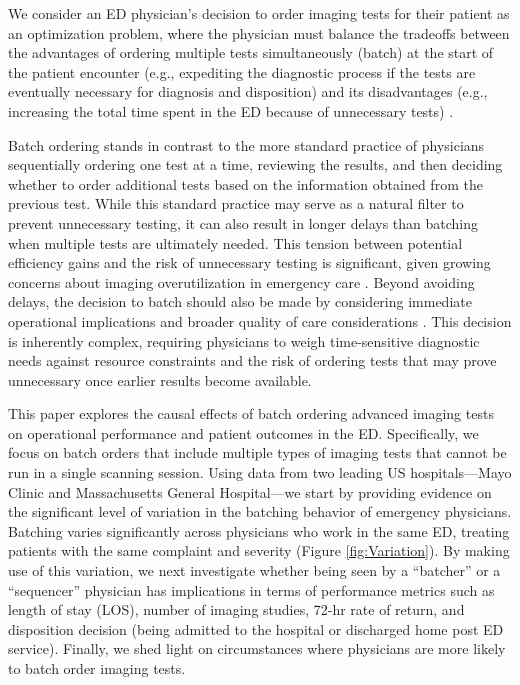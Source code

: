 \documentclass[,,nonblindrev]{informs}
\begin{document}
We consider an ED physician's decision to order imaging tests for their
patient as an optimization problem, where the physician must balance the
tradeoffs between the advantages of ordering multiple tests
simultaneously (batch) at the start of the patient encounter (e.g.,
expediting the diagnostic process if the tests are eventually necessary
for diagnosis and disposition) and its disadvantages (e.g., increasing
the total time spent in the ED because of unnecessary tests)
\citep[\citet{Perotte2018}, \citet{Lyu2017},
\citet{Traub2018}]{Tamburrano2020}.

Batch ordering stands in contrast to the more standard practice of
physicians sequentially ordering one test at a time, reviewing the
results, and then deciding whether to order additional tests based on
the information obtained from the previous test. While this standard
practice may serve as a natural filter to prevent unnecessary testing,
it can also result in longer delays than batching when multiple tests
are ultimately needed. This tension between potential efficiency gains
and the risk of unnecessary testing is significant, given growing
concerns about imaging overutilization in emergency care
\citep[\citet{mills2015optimizing}]{baloescu2018diagnostic}. Beyond
avoiding delays, the decision to batch should also be made by
considering immediate operational implications and broader quality of
care considerations \citep{Feizi2023}. This decision is inherently
complex, requiring physicians to weigh time-sensitive diagnostic needs
against resource constraints and the risk of ordering tests that may
prove unnecessary once earlier results become available.

This paper explores the causal effects of batch ordering advanced
imaging tests on operational performance and patient outcomes in the ED.
Specifically, we focus on batch orders that include multiple types of
imaging tests that cannot be run in a single scanning session. Using
data from two leading US hospitals---Mayo Clinic and Massachusetts
General Hospital---we start by providing evidence on the significant
level of variation in the batching behavior of emergency physicians.
Batching varies significantly across physicians who work in the same ED,
treating patients with the same complaint and severity (Figure
\ref{fig:Variation}). By making use of this variation, we next
investigate whether being seen by a ``batcher'' or a ``sequencer''
physician has implications in terms of performance metrics such as
length of stay (LOS), number of imaging studies, 72-hr rate of return,
and disposition decision (being admitted to the hospital or discharged
home post ED service). Finally, we shed light on circumstances where
physicians are more likely to batch order imaging tests.
\end{document}
